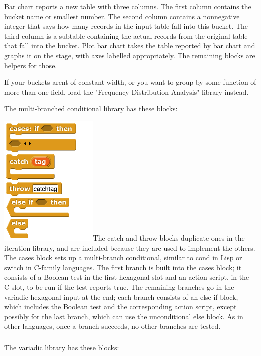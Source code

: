 Bar chart reports a new table with three columns. The first column
contains the bucket name or smallest number. The second column contains
a nonnegative integer that says how many records in the input table fall
into this bucket. The third column is a subtable containing the actual
records from the original table that fall into the bucket. Plot bar
chart takes the table reported by bar chart and graphs it on the stage,
with axes labelled appropriately. The remaining blocks are helpers for
those.

If your buckets aren\textquotesingle t of constant width, or you want to
group by some function of more than one field, load the "Frequency
Distribution Analysis" library instead.

The multi-branched conditional library has these blocks:

\includegraphics[width=1.85in,height=2.47986in]{media/image397.png}The
catch and throw blocks duplicate ones in the iteration library, and are
included because they are used to implement the others. The cases block
sets up a multi-branch conditional, similar to cond in Lisp or switch in
C-family languages. The first branch is built into the cases block; it
consists of a Boolean test in the first hexagonal slot and an action
script, in the C-slot, to be run if the test reports true. The remaining
branches go in the variadic hexagonal input at the end; each branch
consists of an else if block, which includes the Boolean test and the
corresponding action script, except possibly for the last branch, which
can use the unconditional else block. As in other languages, once a
branch succeeds, no other branches are tested.

\subsubsection{}\label{section-1}

The variadic library has these blocks:


